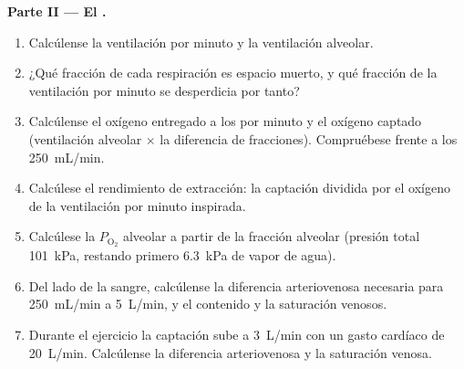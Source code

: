 \begin{problem}
\medskip
\noindent\textbf{Parte II --- El .}
\begin{enumerate}[resume]
  \item Calcúlense la ventilación por minuto y la ventilación alveolar.
  \item ¿Qué fracción de cada respiración es espacio muerto, y qué fracción
        de la ventilación por minuto se desperdicia por tanto?
  \item Calcúlense el oxígeno entregado a los  por minuto y el
        oxígeno captado (ventilación alveolar $\times$ la diferencia de
        fracciones). Compruébese frente a los \qty{250}{mL/min}.
  \item Calcúlese el rendimiento de extracción: la captación dividida por
        el oxígeno de la ventilación por minuto inspirada.
  \item Calcúlese la $P_{\mathrm{O_2}}$ alveolar a partir de la fracción
        alveolar (presión total \qty{101}{kPa}, restando primero
        \qty{6.3}{kPa} de vapor de agua).
  \item Del lado de la sangre, calcúlense la diferencia arteriovenosa
        necesaria para \qty{250}{mL/min} a \qty{5}{L/min}, y el contenido y
        la saturación venosos.
  \item Durante el ejercicio la captación sube a \qty{3}{L/min} con un
        gasto cardíaco de \qty{20}{L/min}. Calcúlense la diferencia
        arteriovenosa y la saturación venosa.
\end{enumerate}


\end{problem}
